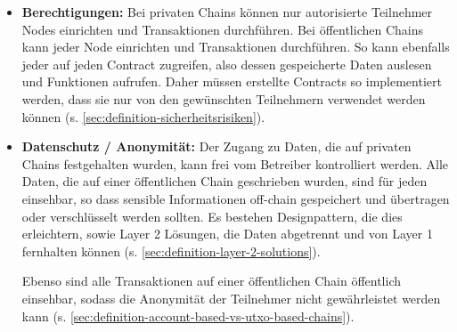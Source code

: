 \begin{itemize}
    \item \textbf{Berechtigungen:}
    Bei privaten Chains können nur autorisierte Teilnehmer Nodes einrichten und Transaktionen durchführen.
    Bei öffentlichen Chains kann jeder Node einrichten und Transaktionen durchführen.
    So kann ebenfalls jeder auf jeden Contract zugreifen, also dessen gespeicherte Daten auslesen und Funktionen aufrufen.
    Daher müssen erstellte Contracts so implementiert werden, dass sie nur von den gewünschten Teilnehmern verwendet werden können (s. \ref{sec:definition-sicherheitsrisiken}).

    \item \textbf{Datenschutz / Anonymität:}
    Der Zugang zu Daten, die auf privaten Chains festgehalten wurden, kann frei vom Betreiber kontrolliert werden. 
    Alle Daten, die auf einer öffentlichen Chain geschrieben wurden, sind für jeden einsehbar, so dass sensible Informationen off-chain gespeichert und übertragen  oder verschlüsselt werden sollten. 
    Es bestehen Designpattern, die dies erleichtern, sowie Layer 2 Lösungen, die Daten abgetrennt und von Layer 1 fernhalten können (s. \ref{sec:definition-layer-2-solutions}).

    Ebenso sind alle Transaktionen auf einer öffentlichen Chain öffentlich einsehbar, sodass die Anonymität der Teilnehmer nicht gewährleistet werden kann (s. \ref{sec:definition-account-based-vs-utxo-based-chains}).
\end{itemize}

